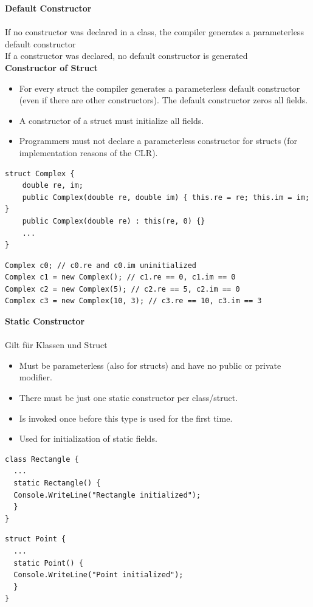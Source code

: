 \textbf{Default Constructor}\\ \\
If no constructor was declared in a class, the compiler generates a parameterless default constructor\\
If a constructor was declared, no default constructor is generated\\ 

\newpage
\textbf{Constructor of Struct}
\begin{itemize}
	\item For every struct the compiler generates a parameterless default constructor (even if there are other constructors).
		  The default constructor zeros all fields.
	\item A constructor of a struct must initialize all fields.
	\item Programmers must not declare a parameterless constructor for structs (for implementation reasons of the CLR).
\end{itemize}

\begin{multicols}{2}
\begin{lstlisting}
struct Complex {
	double re, im;
	public Complex(double re, double im) { this.re = re; this.im = im; }
	public Complex(double re) : this(re, 0) {}
	...
}
\end{lstlisting}
\columnbreak
\begin{lstlisting}
Complex c0; // c0.re and c0.im uninitialized
Complex c1 = new Complex(); // c1.re == 0, c1.im == 0
Complex c2 = new Complex(5); // c2.re == 5, c2.im == 0
Complex c3 = new Complex(10, 3); // c3.re == 10, c3.im == 3
\end{lstlisting}
\end{multicols}


\textbf{Static Constructor}\\ \\
Gilt für Klassen und Struct
\begin{itemize}
	\item Must be parameterless (also for structs) and have no public or private modifier.
	\item There must be just one static constructor per class/struct.
	\item Is invoked once before this type is used for the first time.
	\item Used for initialization of static fields.
\end{itemize}

\begin{multicols}{2}
\begin{lstlisting}
class Rectangle {
  ...
  static Rectangle() {
  Console.WriteLine("Rectangle initialized");
  }
}
\end{lstlisting}
\columnbreak
\begin{lstlisting}
struct Point {
  ...
  static Point() {
  Console.WriteLine("Point initialized");
  }
}
\end{lstlisting}
\end{multicols}

